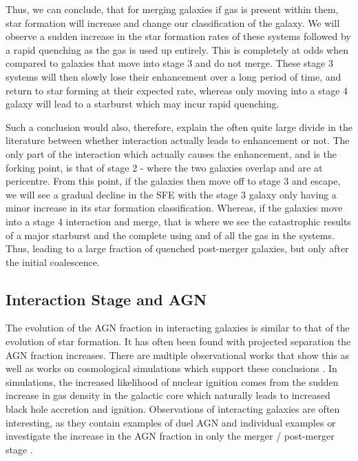 Thus, we can conclude, that for merging galaxies if gas is present within them, star formation will increase and change our classification of the galaxy. We will observe a sudden increase in the star formation rates of these systems followed by a rapid quenching as the gas is used up entirely. This is completely at odds when compared to galaxies that move into stage 3 and do not merge. These stage 3 systems will then slowly lose their enhancement over a long period of time, and return to star forming at their expected rate, whereas only moving into a stage 4 galaxy will lead to a starburst which may incur rapid quenching.

Such a conclusion would also, therefore, explain the often quite large divide in the literature between whether interaction actually leads to enhancement or not. The only part of the interaction which actually causes the enhancement, and is the forking point, is that of stage 2 - where the two galaxies overlap and are at pericentre. From this point, if the galaxies then move off to stage 3 and escape, we will see a gradual decline in the SFE with the stage 3 galaxy only having a minor increase in its star formation classification. Whereas, if the galaxies move into a stage 4 interaction and merge, that is where we see the catastrophic results of a major starburst and the complete using and of all the gas in the systems. Thus, leading to a large fraction of quenched post-merger galaxies, but only after the initial coalescence. 

\subsection{Interaction Stage and AGN}
\noindent The evolution of the AGN fraction in interacting galaxies is similar to that of the evolution of star formation. It has often been found with projected separation the AGN fraction increases. There are multiple observational works that show this \citep{2007MNRAS.375.1017A, 2013MNRAS.435.3627E, 2020ApJ...904..107S} as well as works on cosmological simulations which support these conclusions \citep{2023MNRAS.519.4966B}. In simulations, the increased likelihood of nuclear ignition comes from the sudden increase in gas density in the galactic core which naturally leads to increased black hole accretion and ignition. Observations of interacting galaxies are often interesting, as they contain examples of duel AGN and individual examples \citep[e.g.][]{2017MNRAS.470L..49E, 2021ApJ...923...36S} or investigate the increase in the AGN fraction in only the merger / post-merger stage \citep{2020A&A...637A..94G}.

